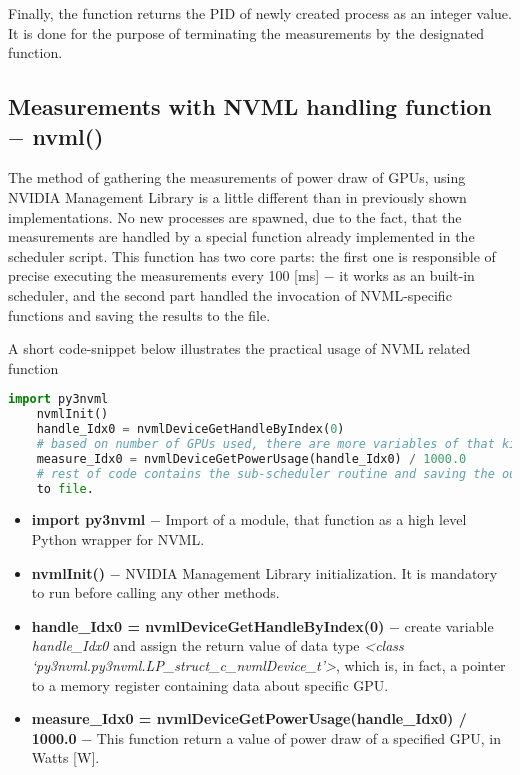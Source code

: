 Finally, the function returns the PID of newly created process
as an integer value. It is done for the purpose of terminating the
measurements by the designated function.

\subsection{Measurements with NVML handling function $-$ nvml\@()}

The method of gathering the measurements of power draw of GPUs, using NVIDIA
Management Library is a little different than in previously shown
implementations. No new processes are spawned, due to the fact, that the
measurements are handled by a special function already implemented in the
scheduler script. This function has two core parts: the first one is
responsible of precise executing the measurements every 100 [ms] $-$ it works
as an built-in scheduler, and the second part handled the invocation of
NVML-specific functions and saving the results to the file.

A short code-snippet below illustrates the practical usage of NVML related
function

\begin{lstlisting}[language=Python]
    import py3nvml
    nvmlInit()
    handle_Idx0 = nvmlDeviceGetHandleByIndex(0)
    # based on number of GPUs used, there are more variables of that kind
    measure_Idx0 = nvmlDeviceGetPowerUsage(handle_Idx0) / 1000.0
    # rest of code contains the sub-scheduler routine and saving the output
    to file.
\end{lstlisting}

\begin{itemize}
    \item \textbf{import py3nvml} $-$ Import of a module, that function as
    a high level Python wrapper for NVML\@.
    \item \textbf{nvmlInit\@()} $-$ NVIDIA Management Library initialization.
    It is mandatory to run before calling any other methods.
    \item \textbf{handle\_Idx0 = nvmlDeviceGetHandleByIndex\@(0)} $-$ create
    variable \emph{handle\_Idx0} and assign the return value of data type
    \emph{<class `py3nvml.py3nvml.LP\_struct\_c\_nvmlDevice\_t'>}, which is,
    in fact, a pointer to a memory register containing data about specific
    GPU\@.
    \item \textbf{measure\_Idx0 = nvmlDeviceGetPowerUsage\@(handle\_Idx0) / 1000.0}
    $-$ This function return a value of power draw of a specified GPU, in
    Watts [W]. 
\end{itemize}

